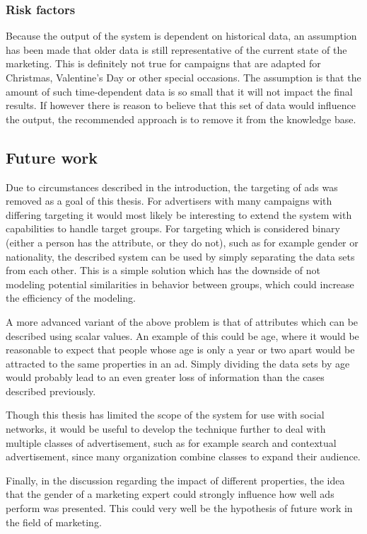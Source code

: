 \documentclass{sig-alternate}
\begin{document}
\subsubsection{Risk factors}
Because the output of the system is dependent on historical data, an assumption has been made that older data is still representative of the current state of the marketing. This is definitely not true for campaigns that are adapted for Christmas, Valentine's Day or other special occasions. The assumption is that the amount of such time-dependent data is so small that it will not impact the final results. If however there is reason to believe that this set of data would influence the output, the recommended approach is to remove it from the knowledge base.

\subsection{Future work}
Due to circumstances described in the introduction, the targeting of ads was removed as a goal of this thesis. For advertisers with many campaigns with differing targeting it would most likely be interesting to extend the system with capabilities to handle target groups. For targeting which is considered binary (either a person has the attribute, or they do not), such as for example gender or nationality, the described system can be used by simply separating the data sets from each other. This is a simple solution which has the downside of not modeling potential similarities in behavior between groups, which could increase the efficiency of the modeling.

A more advanced variant of the above problem is that of attributes which can be described using scalar values. An example of this could be age, where it would be reasonable to expect that people whose age is only a year or two apart would be attracted to the same properties in an ad. Simply dividing the data sets by age would probably lead to an even greater loss of information than the cases described previously.

Though this thesis has limited the scope of the system for use with social networks, it would be useful to develop the technique further to deal with multiple classes of advertisement, such as for example search and contextual advertisement, since many organization combine classes to expand their audience.

Finally, in the discussion regarding the impact of different properties, the idea that the gender of a marketing expert could strongly influence how well ads perform was presented. This could very well be the hypothesis of future work in the field of marketing.
\end{document}
